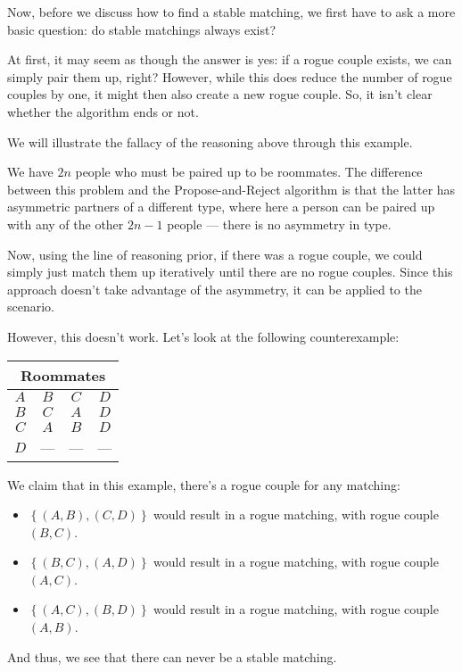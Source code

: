 \documentclass[openany]{book}
\begin{document}
Now, before we discuss how to find a stable matching, we first have to ask a more basic question: do stable matchings always exist?

At first, it may seem as though the answer is yes: if a rogue couple exists, we can simply pair them up, right? However, while this does reduce the number of rogue couples by one, it might then also create a new rogue couple. So, it isn't clear whether the algorithm ends or not.

\begin{example}
	We will illustrate the fallacy of the reasoning above through this example.
	
	We have $2n$ people who must be paired up to be roommates. The difference between this problem and the Propose-and-Reject algorithm is that the latter has asymmetric partners of a different type, where here a person can be paired up with any of the other $2n-1$ people --- there is no asymmetry in type.
	
	Now, using the line of reasoning prior, if there was a rogue couple, we could simply just match them up iteratively until there are no rogue couples. Since this approach doesn't take advantage of the asymmetry, it can be applied to the scenario.
	
	However, this doesn't work. Let's look at the following counterexample:
	
	\begin{center}
		\begin{tabular}{|c|ccc|}
			\hline
			\multicolumn{4}{|c|}{Roommates} \\
			\hline
			$A$ & $B$ & $C$ & $D$ \\
			\hline
			$B$ & $C$ & $A$ & $D$ \\
			\hline
			$C$ & $A$ & $B$ & $D$ \\
			\hline
			$D$ & --- & --- & --- \\
			\hline
		\end{tabular}
	\end{center}

	We claim that in this example, there's a rogue couple for any matching:
	\begin{itemize}
		\item 	$\left\{  (A,B), (C,D) \right\}$ would result in a rogue matching, with rogue couple $(B, C)$. 
		\item $\left\{ (B,C), (A,D) \right\}$ would result in a rogue matching, with rogue couple $(A,C)$. 
		\item $\left\{  (A,C), (B,D) \right\}$ would result in a rogue matching, with rogue couple $(A,B)$.
	\end{itemize}

	And thus, we see that there can never be a stable matching.
\end{example}
\end{document}
